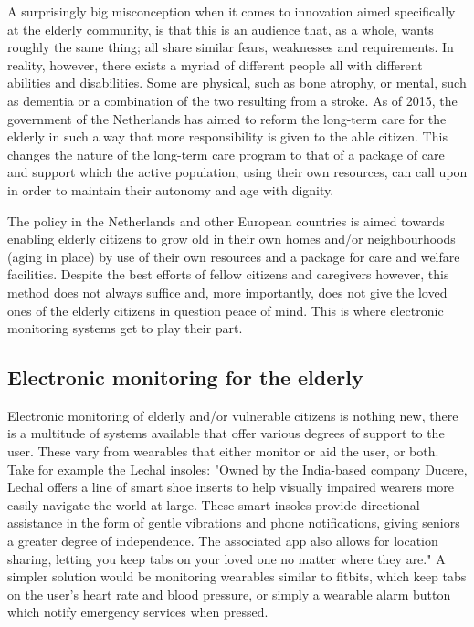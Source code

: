 \documentclass{below-ext}
\begin{document}
A surprisingly big misconception when it comes to innovation aimed specifically at the elderly community, is that this is an audience that, as a whole, wants roughly the same thing; all share similar fears, weaknesses and requirements. In reality, however, there exists a myriad of different people all with different abilities and disabilities. Some are physical, such as bone atrophy, or mental, such as dementia or a combination of the two resulting from a stroke\cite{waag}. As of 2015, the government of the Netherlands has aimed to reform the long-term care for the elderly in such a way that more responsibility is given to the able citizen. This changes the nature of the long-term care program to that of a package of care and support which the active population, using their own resources, can call upon in order to maintain their autonomy and age with dignity\cite{langerzelfstandig}.

The policy in the Netherlands and other European countries is aimed towards enabling elderly citizens to grow old in their own homes and/or neighbourhoods (aging in place) by use of their own resources and a package for care and welfare facilities. \cite{thomas2009moving} Despite the best efforts of fellow citizens and caregivers however, this method does not always suffice and, more importantly, does not give the loved ones of the elderly citizens in question peace of mind. This is where electronic monitoring systems get to play their part.


\subsection{Electronic monitoring for the elderly}
Electronic monitoring of elderly and/or vulnerable citizens is nothing new, there is a multitude of systems available that offer various degrees of support to the user.\cite{alemdar2010wireless} These vary from wearables that either monitor or aid the user, or both. Take for example the Lechal insoles: "Owned by the India-based company Ducere, Lechal offers a line of smart shoe inserts to help visually impaired wearers more easily navigate the world at large. These smart insoles provide directional assistance in the form of gentle vibrations and phone notifications, giving seniors a greater degree of independence. The associated app also allows for location sharing, letting you keep tabs on your loved one no matter where they are." \cite{safewise} A simpler solution would be monitoring wearables similar to fitbits, which keep tabs on the user's heart rate and blood pressure, or simply a wearable alarm button which notify emergency services when pressed.
\end{document}
